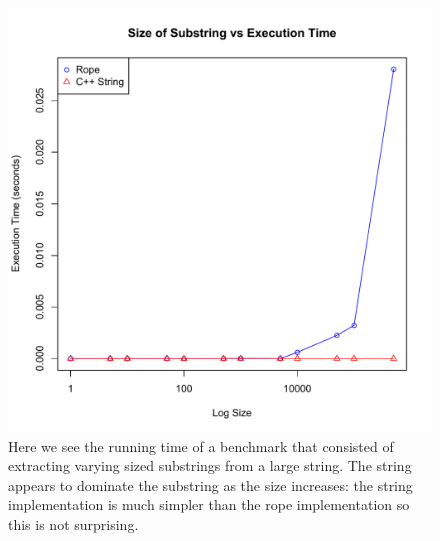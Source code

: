 \documentclass[12pt]{article}
\begin{document}
\begin{figure}[p]
\begin{centering}
\includegraphics[scale=1.0]{substring_vs_execution}
\caption{Here we see the running time of a benchmark that consisted of extracting varying sized substrings from a large string. The string appears to dominate the substring as the size increases: the string implementation is much simpler than the rope implementation so this is not surprising.}
\end{centering}
\end{figure}
\end{document}
